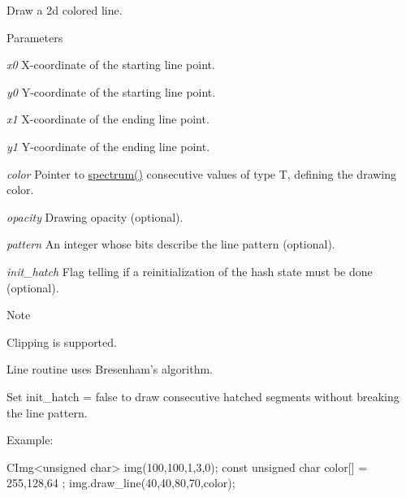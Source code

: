 Draw a 2d colored line. 


\begin{DoxyParams}{Parameters}
\item[{\em x0}]X-\/coordinate of the starting line point. \item[{\em y0}]Y-\/coordinate of the starting line point. \item[{\em x1}]X-\/coordinate of the ending line point. \item[{\em y1}]Y-\/coordinate of the ending line point. \item[{\em color}]Pointer to {\ttfamily \hyperlink{structcimg__library_1_1CImg_acd2ee207fa512e34b45ff548082f70ba}{spectrum()}} consecutive values of type {\ttfamily T}, defining the drawing color. \item[{\em opacity}]Drawing opacity (optional). \item[{\em pattern}]An integer whose bits describe the line pattern (optional). \item[{\em init\_\-hatch}]Flag telling if a reinitialization of the hash state must be done (optional). \end{DoxyParams}
\begin{DoxyNote}{Note}

\begin{DoxyItemize}
\item Clipping is supported.
\item Line routine uses Bresenham's algorithm.
\item Set {\ttfamily init\_\-hatch} = false to draw consecutive hatched segments without breaking the line pattern. 
\end{DoxyItemize}
\end{DoxyNote}
\begin{DoxyParagraph}{Example:}

\begin{DoxyCode}
       CImg<unsigned char> img(100,100,1,3,0);
       const unsigned char color[] = { 255,128,64 };
        img.draw_line(40,40,80,70,color);
\end{DoxyCode}
 
\end{DoxyParagraph}
